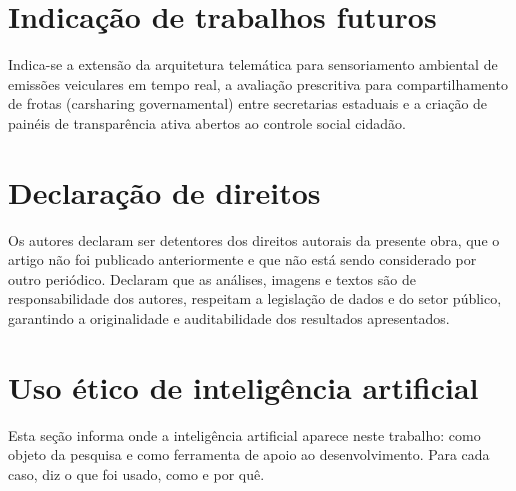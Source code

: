 \documentclass[12pt,a4paper]{article}
\begin{document}
\section{Indicação de trabalhos futuros}

Indica-se a extensão da arquitetura telemática para sensoriamento ambiental de emissões veiculares em tempo real, a avaliação prescritiva para compartilhamento de frotas (carsharing governamental) entre secretarias estaduais e a criação de painéis de transparência ativa abertos ao controle social cidadão.


\section{Declaração de direitos}

Os autores declaram ser detentores dos direitos autorais da presente obra, que o artigo não foi publicado anteriormente e que não está sendo considerado por outro periódico. Declaram que as análises, imagens e textos são de responsabilidade dos autores, respeitam a legislação de dados e do setor público, garantindo a originalidade e auditabilidade dos resultados apresentados.


\section{Uso ético de inteligência artificial}
\label{sec:uso-etico-ia}
Esta seção informa onde a inteligência artificial aparece neste trabalho: como objeto da pesquisa e como ferramenta de apoio ao desenvolvimento. Para cada caso, diz o que foi usado, como e por quê.
\end{document}

